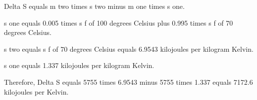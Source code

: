 Delta S equals m two times s two minus m one times s one.  

s one equals 0.005 times s f of 100 degrees Celsius plus 0.995 times s f of 70 degrees Celsius.  

s two equals s f of 70 degrees Celsius equals 6.9543 kilojoules per kilogram Kelvin.  

s one equals 1.337 kilojoules per kilogram Kelvin.  

Therefore, Delta S equals 5755 times 6.9543 minus 5755 times 1.337 equals 7172.6 kilojoules per Kelvin.